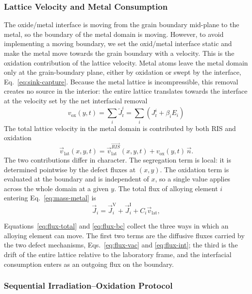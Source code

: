 \documentclass[3p,times,nonatbib]{elsarticle} %
\newcommand{\Vac}{\mathrm{V}}          %
\newcommand{\Int}{\mathrm{I}}          %
\newcommand{\lat}{\mathrm{lat}}
\newcommand{\ox}{\mathrm{ox}}
\begin{document}
\subsubsection{Lattice Velocity and Metal Consumption}
\label{sec:methodLattice}
The oxide/metal interface is moving from the grain boundary mid-plane to the metal, so the boundary of the metal domain is moving. However, to avoid implementing a moving boundary, we set the oxid/metal interface static and make the metal move towards the grain boundary with a velocity. This is the oxidation contribution of the lattice velocity. Metal atoms leave the metal domain only at the grain-boundary plane, either by oxidation or swept by the interface, Eq.~\eqref{eq:sink-capture}. Because
the metal lattice is incompressible, this removal creates no source in the
interior: the entire lattice translates towards the interface at the velocity set by the net interfacial removal
\begin{equation}
v_{\ox}(y,t)=\sum_i \tilde{J}_{\mathrm{r}}^{i}
 =\sum_i\left(J_{\mathrm{r}}^{i}+\beta_i E_i\right)
\label{eq:vlat-ox}
\end{equation}
The total lattice velocity in the metal domain is contributed by both RIS and oxidation
\begin{equation}
\vec{v}_{\lat}(x,y,t)
 =\vec{v}_{\lat}^{\vec{RIS}}(x,y,t)
  +v_{\ox}(y,t)\,\vec{n} .
\label{eq:vlat-total}
\end{equation}
The two contributions differ in character. The segregation term is local: it is determined pointwise by the defect fluxes at \((x,y)\). The oxidation term is evaluated at the boundary and is independent of \(x\), so a single value applies across the whole domain at a given \(y\). The total flux of alloying element \(i\) entering
Eq.~\eqref{eq:mass-metal} is
\begin{equation}
\vec{J}_i
 = \vec{J}_i^{\Vac}+\vec{J}_i^{\Int}
  +C_i\vec{v}_{\lat} ,
\label{eq:flux-total}
\end{equation}

Equations~\eqref{eq:flux-total} and \eqref{eq:flux-bc} collect the three ways in which an alloying element can move. The first two terms are the diffusive fluxes carried by
the two defect mechanisms, Eqs.~\eqref{eq:flux-vac} and \eqref{eq:flux-int}; the third is the drift of the entire lattice relative to the laboratory frame, and the interfacial consumption enters as an outgoing flux on the boundary.

\subsubsection{Sequential Irradiation--Oxidation Protocol}
\label{sec:methodSequential}
\end{document}
